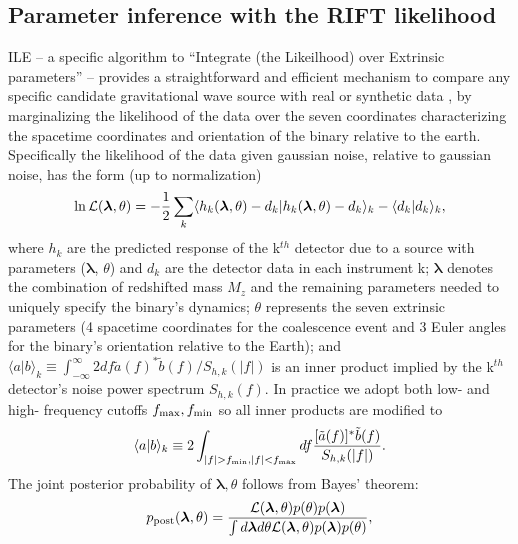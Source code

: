 \documentclass[twocolumn,prd,nofootinbib]{revtex4}
\newcommand\ILE{ILE}
\begin{document}
\subsection{Parameter inference with the RIFT likelihood}
\ILE{}  -- a specific algorithm to ``Integrate (the Likeilhood) over Extrinsic parameters'' -- provides a straightforward and efficient mechanism to compare any specific candidate gravitational wave source with
real or synthetic data   \cite{gwastro-PE-AlternativeArchitectures,NRPaper,2017PhRvD..96j4041L,2017CQGra..34n4002O},
by marginalizing the likelihood of the data over the seven coordinates characterizing the spacetime coordinates and
orientation of the binary relative to the earth.  
Specifically the likelihood of the data given gaussian noise, relative to gaussian noise, has the form  (up to normalization)
\begin{equation}
\label{eq:lnL}
\ln {\cal L}(\bm{\lambda} ,\theta )=-\frac{1}{2}\sum\limits_{k}\langle h_{k}(\bm{\lambda} ,\theta )-d_{k} |h_{k}(\bm{\lambda} ,\theta )-d_{k}\rangle _{k}-\langle d_{k}|d_{k}\rangle _{k},
\end{equation}
where $h_{k}$ are the predicted response of the k$^{th}$ detector due to a source with parameters ($\bm{\lambda}$, $\theta$) and
$d_{k}$ are the detector data in each instrument k; $\bm{\lambda}$ denotes the combination of redshifted mass $M_{z}$ and the
remaining parameters needed to uniquely specify the binary's dynamics; $\theta$ represents the
seven extrinsic parameters (4 spacetime coordinates for the coalescence event and 3 Euler angles for the binary's
orientation relative to the Earth); and $\langle a|b\rangle_{k}\equiv
\int_{-\infty}^{\infty}2df\tilde{a}(f)^{*}\tilde{b}(f)/S_{h,k}(|f|)$ is an inner product implied by the k$^{th}$ detector's
noise power spectrum $S_{h,k}(f)$. 
In practice we adopt both  low- and high- frequency cutoffs $f_{\rm max},f_{\rm min}$ so all inner products are modified to
\begin{equation}
\label{eq:overlap}
\langle a|b\rangle_{k}\equiv 2 \int_{|f|>f_{\rm min},|f|<f_{\rm max}}df\frac{[\tilde{a}(f)]^{*}\tilde{b}(f)}{S_{h,k}(|f|)}.
\end{equation}
The joint posterior probability of $\bm{\lambda} ,\theta$ follows from Bayes' theorem:
\begin{equation}
p_{\rm post}(\bm{\lambda} ,\theta)=\frac{ {\cal L}(\bm{\lambda} ,\theta)p(\theta)p(\bm{\lambda})}{\int d\bm{\lambda} d\theta {\cal L}(\bm{\lambda} ,\theta)p(\bm{\lambda})p(\theta)},
\end{equation}
\end{document}
